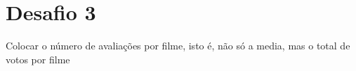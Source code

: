 \documentclass[11pt]{article}
\begin{document}
    \section{Desafio 3}\label{desafio-3}

Colocar o número de avaliações por filme, isto é, não só a media, mas o
total de votos por filme


    
    
    
    
\end{document}
